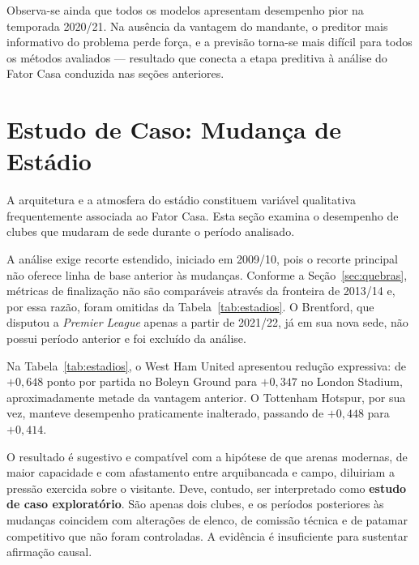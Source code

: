 Observa-se ainda que todos os modelos apresentam desempenho pior na temporada
2020/21. Na ausência da vantagem do mandante, o preditor mais informativo do
problema perde força, e a previsão torna-se mais difícil para todos os métodos
avaliados — resultado que conecta a etapa preditiva à análise do Fator Casa
conduzida nas seções anteriores.

\section{Estudo de Caso: Mudança de Estádio}\label{sec:resultados-estadios}

A arquitetura e a atmosfera do estádio constituem variável qualitativa
frequentemente associada ao Fator Casa. Esta seção examina o desempenho de
clubes que mudaram de sede durante o período analisado.

A análise exige recorte estendido, iniciado em 2009/10, pois o recorte principal
não oferece linha de base anterior às mudanças. Conforme a
Seção~\ref{sec:quebras}, métricas de finalização não são comparáveis através da
fronteira de 2013/14 e, por essa razão, foram omitidas da
Tabela~\ref{tab:estadios}. O Brentford, que disputou a \textit{Premier League}
apenas a partir de 2021/22, já em sua nova sede, não possui período anterior e
foi excluído da análise.

\begin{table}[htb]
  \centering
  \caption{Desempenho antes e depois da mudança de estádio.}
  \label{tab:estadios}
  \resizebox{\textwidth}{!}{}
\end{table}

Na Tabela~\ref{tab:estadios}, o West Ham United apresentou redução expressiva:
de $+0{,}648$ ponto por partida
no Boleyn Ground para $+0{,}347$ no London Stadium, aproximadamente metade da
vantagem anterior. O Tottenham Hotspur, por sua vez, manteve desempenho
praticamente inalterado, passando de $+0{,}448$ para $+0{,}414$.

O resultado é sugestivo e compatível com a hipótese de que arenas modernas, de
maior capacidade e com afastamento entre arquibancada e campo, diluiriam a
pressão exercida sobre o visitante. Deve, contudo, ser interpretado como
\textbf{estudo de caso exploratório}. São apenas dois clubes, e os períodos
posteriores às mudanças coincidem com alterações de elenco, de comissão técnica e
de patamar competitivo que não foram controladas. A evidência é insuficiente para
sustentar afirmação causal.
